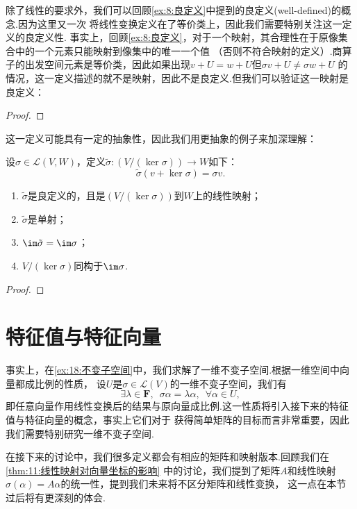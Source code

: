 除了线性的要求外，我们可以回顾\autoref{ex:8:良定义}中提到的良定义(well-defined)的概念.因为这里又一次
将线性变换定义在了等价类上，因此我们需要特别关注这一定义的良定义性.
事实上，回顾\autoref{ex:8:良定义}，对于一个映射，其合理性在于原像集合中的一个元素只能映射到像集中的唯一一个值
（否则不符合映射的定义）.商算子的出发空间元素是等价类，因此如果出现$v+U=w+U$但$\sigma v+U\neq \sigma w+U$
的情况，这一定义描述的就不是映射，因此不是良定义.但我们可以验证这一映射是良定义：

\begin{proof}
    
\end{proof}

这一定义可能具有一定的抽象性，因此我们用更抽象的例子来加深理解：
\begin{example}
    设$\sigma\in \mathcal{L}(V,W)$，定义$\tilde{\sigma}:(V/(\ker \sigma))\to W$如下：
    \[\tilde{\sigma}(v+\ker\sigma)=\sigma v.\]
    \begin{enumerate}[label=(\arabic*)]
        \item $\tilde{\sigma}$是良定义的，且是$(V/(\ker \sigma))$到$W$上的线性映射；

        \item $\tilde{\sigma}$是单射；

        \item $\im \tilde{\sigma}=\im \sigma$；

        \item $V/(\ker \sigma)$同构于$\im \sigma$.
    \end{enumerate}
\end{example}
\begin{proof}
    
\end{proof}

\section{特征值与特征向量}
事实上，在\autoref{ex:18:不变子空间}中，我们求解了一维不变子空间.根据一维空间中向量都成比例的性质，
设$U$是$\sigma\in\mathcal{L}(V)$的一维不变子空间，我们有
\[\exists\lambda\in\mathbf{F},\enspace\sigma\alpha=\lambda\alpha,\enspace\forall \alpha\in U,\]
即任意向量作用线性变换后的结果与原向量成比例.这一性质将引入接下来的特征值与特征向量的概念，事实上它们对于
获得简单矩阵的目标而言非常重要，因此我们需要特别研究一维不变子空间.

在接下来的讨论中，我们很多定义都会有相应的矩阵和映射版本.回顾我们在\autoref{thm:11:线性映射对向量坐标的影响}
中的讨论，我们提到了矩阵$A$和线性映射$\sigma(\alpha)=A\alpha$的统一性，提到我们未来将不区分矩阵和线性变换，
这一点在本节过后将有更深刻的体会.

